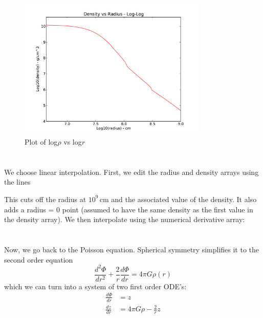 \documentclass[11pt,letterpaper]{article}
\newcommand{\unit}[1]{\ensuremath{\, \mathrm{#1}}}
\begin{document}
\begin{figure}[bth]
\centering
\includegraphics[width=0.8\textwidth]{density-loglog.pdf}
\caption{Plot of log$\rho$ vs log$r$}
\label{fig:densityloglog}
\end{figure}


\section{}

We choose linear interpolation. First, we edit the radius and density arrays using
the lines

This cuts off the radius at $10^9 \unit{cm}$ and the associated value of the density.
It also adds a radius = 0 point (assumed to have the same density as the first value
in the density array). We then interpolate using the numerical derivative array:


\section{}

Now, we go back to the Poisson equation. Spherical symmetry simplifies it to the second 
order equation
$$ \frac{d^2\Phi}{dr^2} + \frac{2}{r}\frac{d\Phi}{dr} = 4\pi G\rho(r) $$
which we can turn into a system of two first order ODE's:
\begin{align*}
\frac{d\Phi}{dr} &= z \\
\frac{dz}{dr} &= 4\pi G\rho - \frac{2}{r}z
\end{align*}
\end{document}
